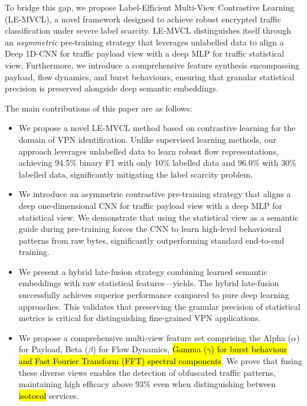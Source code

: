 To bridge this gap, we propose Label-Efficient Multi-View Contrastive Learning (LE-MVCL), a novel framework designed to achieve robust encrypted traffic classification under severe label scarcity. LE-MVCL distinguishes itself through an \textit{asymmetric} pre-training strategy that leverages unlabelled data to align a Deep 1D-CNN for traffic payload view with a deep MLP for traffic statistical view. Furthermore, we introduce a comprehensive feature synthesis encompassing payload, flow dynamics, and burst behaviours, ensuring that granular statistical precision is preserved alongside deep semantic embeddings.

The main contributions of this paper are as follows:
\begin{itemize}
    \item We propose a novel LE-MVCL method based on contrastive learning for the domain of VPN identification. Unlike supervised learning methods, our approach leverages unlabelled data to learn robust flow representations, achieving 94.5\% binary F1 with only 10\% labelled data and 96.0\% with 30\% labelled data, significantly mitigating the label scarcity problem.
    
    \item We introduce an asymmetric contrastive pre-training strategy that aligns a deep one-dimensional CNN for traffic payload view with a deep MLP for statistical view. We demonstrate that using the statistical view as a semantic guide during pre-training forces the CNN to learn high-level behavioural patterns from raw bytes, significantly outperforming standard end-to-end training.
    
    \item We present a hybrid late-fusion strategy combining learned semantic embeddings with raw statistical features—yields. The hybrid late-fusion successfully achieves superior performance compared to pure deep learning approaches. This validates that preserving the granular precision of statistical metrics is critical for distinguishing fine-grained VPN applications.
    
    \item We propose a comprehensive multi-view feature set comprising the Alpha ($\alpha$) for Payload, Beta ($\beta$) for Flow Dynamics, \hl{Gamma ($\gamma$) for burst behaviour and Fast Fourier Transform (FFT) spectral components}. We prove that fusing these diverse views enables the detection of obfuscated traffic patterns, maintaining high efficacy above 93\%  even when distinguishing between \hl{isotocol} services.
\end{itemize}